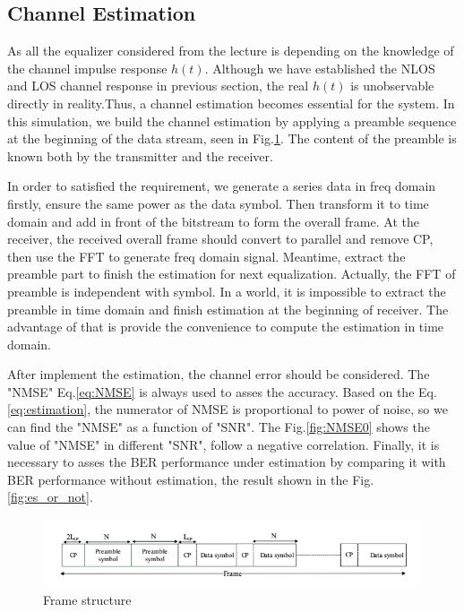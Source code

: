 \documentclass[a4paper]{article}
\begin{document}
    
    
	\subsection{Channel Estimation}
	
	As all the equalizer considered from the lecture is depending on the knowledge of the channel impulse response $h(t)$. Although we have established the NLOS and LOS channel response in previous section, the real $h(t)$ is unobservable directly in reality.Thus, a channel estimation becomes essential for the system. In this simulation, we build the channel estimation by applying a preamble sequence at the beginning of the data stream, seen in Fig.\ref{fig:preamble}. The content of the preamble is known both by the transmitter and the receiver.
    
    In order to satisfied the requirement, we generate a series data in freq domain firstly, ensure the same power as the data symbol. Then transform it to time domain and add in front of the bitstream to form the overall frame.
    At the receiver, the received overall frame should convert to parallel and remove CP, then use the FFT to generate freq domain signal. Meantime, extract the preamble part to finish the estimation for next equalization. Actually, the FFT of preamble is independent with symbol. In a world, it is impossible to extract the preamble in time domain and finish estimation at the beginning of receiver. The advantage of that is provide the convenience to compute the estimation in time domain.
    
    After implement the estimation, the channel error should be considered. The "NMSE" Eq.\ref{eq:NMSE} is always used to asses the accuracy. Based on the Eq.\ref{eq:estimation}, the numerator of NMSE is proportional to power of noise, so we can find the "NMSE" as a function of "SNR". The Fig.\ref{fig:NMSE0} shows the value of "NMSE" in different "SNR", follow a negative correlation.
    Finally, it is necessary to asses the BER performance under estimation by comparing it with BER performance without estimation, the result shown in the Fig.\ref{fig:es_or_not}.
    
    
      \begin{figure}
		\centering
		\includegraphics[scale=0.5]{figures/preamble.png}
		\vspace{-0.2cm}
		\centering
		\caption{Frame structure}
		\label{fig:preamble}
	\end{figure}
    
\end{document}
